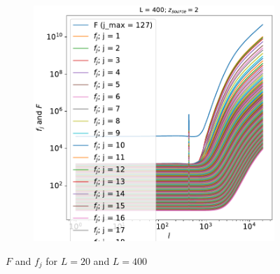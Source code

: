 \documentclass[12pt]{article}
\numberwithin{equation}{section}
\begin{document}
\begin{figure}[h]
\begin{subfigure}{0.49\textwidth}
		\includegraphics[width=\textwidth]{L_400}
		\caption{}
	\end{subfigure}
	\caption{$ F $ and $ f_j $ for $ L = 20 $ and $ L = 400$ }
\end{figure}
\pagebreak
\end{document}
